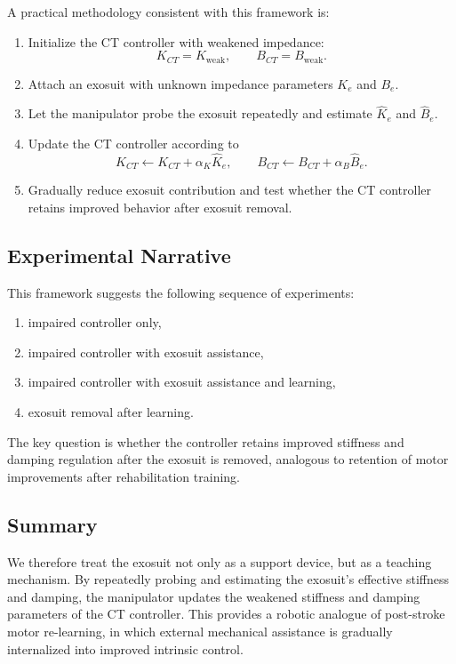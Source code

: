 \documentclass[11pt]{article}
\begin{document}
A practical methodology consistent with this framework is:
\begin{enumerate}
    \item Initialize the CT controller with weakened impedance:
    \begin{equation}
    K_{CT}=K_{\mathrm{weak}}, \qquad B_{CT}=B_{\mathrm{weak}}.
    \end{equation}
    \item Attach an exosuit with unknown impedance parameters \(K_e\) and \(B_e\).
    \item Let the manipulator probe the exosuit repeatedly and estimate \(\hat{K}_e\) and \(\hat{B}_e\).
    \item Update the CT controller according to
    \begin{equation}
    K_{CT} \leftarrow K_{CT}+\alpha_K \hat{K}_e,
    \qquad
    B_{CT} \leftarrow B_{CT}+\alpha_B \hat{B}_e.
    \end{equation}
    \item Gradually reduce exosuit contribution and test whether the CT controller retains improved behavior after exosuit removal.
\end{enumerate}

\subsection{Experimental Narrative}

This framework suggests the following sequence of experiments:
\begin{enumerate}
    \item impaired controller only,
    \item impaired controller with exosuit assistance,
    \item impaired controller with exosuit assistance and learning,
    \item exosuit removal after learning.
\end{enumerate}

The key question is whether the controller retains improved stiffness and damping regulation after the exosuit is removed, analogous to retention of motor improvements after rehabilitation training.

\subsection{Summary}

We therefore treat the exosuit not only as a support device, but as a teaching mechanism. By repeatedly probing and estimating the exosuit's effective stiffness and damping, the manipulator updates the weakened stiffness and damping parameters of the CT controller. This provides a robotic analogue of post-stroke motor re-learning, in which external mechanical assistance is gradually internalized into improved intrinsic control.
\end{document}

